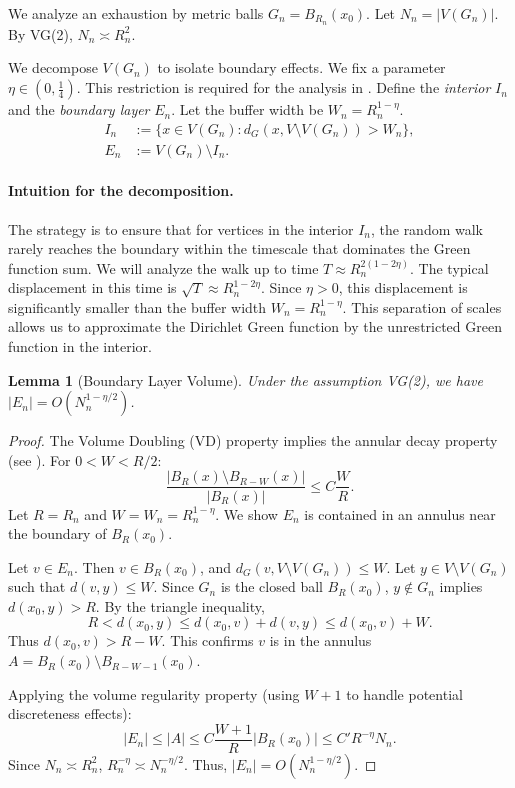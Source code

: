\documentclass[12pt]{amsart}
\newtheorem{lemma}[theorem]{Lemma}
\theoremstyle{definition}
\theoremstyle{remark}
\begin{document}
We analyze an exhaustion by metric balls $G_n = B_{R_n}(x_0)$. Let $N_n = |V(G_n)|$. By VG(2), $N_n \asymp R_n^2$.

We decompose $V(G_n)$ to isolate boundary effects. We fix a parameter $\eta \in (0, \frac{1}{4})$. This restriction is required for the analysis in . Define the \emph{interior} $I_n$ and the \emph{boundary layer} $E_n$. Let the buffer width be $W_n = R_n^{1-\eta}$.
\begin{align*}
I_n &:= \{x \in V(G_n) : d_G(x, V \setminus V(G_n)) > W_n\}, \\
E_n &:= V(G_n) \setminus I_n.
\end{align*}

\paragraph{Intuition for the decomposition.} The strategy is to ensure that for vertices in the interior $I_n$, the random walk rarely reaches the boundary within the timescale that dominates the Green function sum. We will analyze the walk up to time $T \approx R_n^{2(1-2\eta)}$. The typical displacement in this time is $\sqrt{T} \approx R_n^{1-2\eta}$. Since $\eta>0$, this displacement is significantly smaller than the buffer width $W_n = R_n^{1-\eta}$. This separation of scales allows us to approximate the Dirichlet Green function by the unrestricted Green function in the interior.

\begin{lemma}[Boundary Layer Volume]\label{lem:boundary_volume}
Under the assumption VG(2), we have $|E_n| = O(N_n^{1-\eta/2})$.
\end{lemma}
\begin{proof}
The Volume Doubling (VD) property implies the annular decay property (see \cite{Grigoryan09}). For $0 < W < R/2$:
\[
\frac{|B_{R}(x) \setminus B_{R-W}(x)|}{|B_R(x)|} \leq C \frac{W}{R}.
\]
Let $R=R_n$ and $W = W_n = R_n^{1-\eta}$. We show $E_n$ is contained in an annulus near the boundary of $B_R(x_0)$.

Let $v \in E_n$. Then $v \in B_R(x_0)$, and $d_G(v, V \setminus V(G_n)) \leq W$. Let $y \in V \setminus V(G_n)$ such that $d(v,y) \leq W$. Since $G_n$ is the closed ball $B_R(x_0)$, $y \notin G_n$ implies $d(x_0, y) > R$. By the triangle inequality,
\[
R < d(x_0, y) \leq d(x_0, v) + d(v, y) \leq d(x_0, v) + W.
\]
Thus $d(x_0, v) > R-W$. This confirms $v$ is in the annulus $A = B_R(x_0) \setminus B_{R-W-1}(x_0)$.

Applying the volume regularity property (using $W+1$ to handle potential discreteness effects):
\[
|E_n| \leq |A| \leq C \frac{W+1}{R} |B_R(x_0)| \leq C' R^{-\eta} N_n.
\]
Since $N_n \asymp R_n^2$, $R_n^{-\eta} \asymp N_n^{-\eta/2}$. Thus, $|E_n| = O(N_n^{1-\eta/2})$.
\end{proof}
\end{document}
